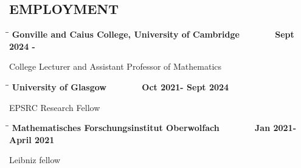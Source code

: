 \documentclass{res}
\begin{document}
 


\address{E-mail: ajm269@cam.ac.uk \\Date of birth: October 24, 1989\\ Webpage: amorgan516.github.io}
                                  
\begin{resume}       
 
 \section{EMPLOYMENT}       

\bigskip 

\vspace{-0.1in}	
   \begin{tabbing}
   \hspace{2in}\= \hspace{2in}\= \kill %
    {\bf Gonville and Caius College, University of Cambridge}\>~\> ~~~~~~ {\bf Sept 2024 - }\\
   \end{tabbing}\vspace{-20pt}      %
College Lecturer and Assistant Professor of Mathematics

\vspace{-0.1in}	
   \begin{tabbing}
   \hspace{2in}\= \hspace{2in}\= \kill %
    {\bf University of Glasgow}\>~\> ~~~~~~ {\bf Oct 2021- Sept 2024}\\
   \end{tabbing}\vspace{-20pt}      %
     EPSRC Research Fellow

\vspace{-0.1in}	
   \begin{tabbing}
   \hspace{2in}\= \hspace{2in}\= \kill %
    {\bf Mathematisches Forschungsinstitut Oberwolfach}\>~\> ~~~~~~ {\bf Jan 2021- April 2021 }\\
   \end{tabbing}\vspace{-20pt}      %
     Leibniz  fellow  


\end{resume}
\end{document}
